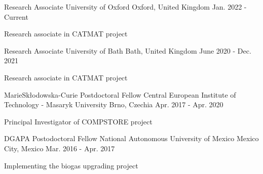 

\begin{cventries}

  \cventry
    {Research Associate} %
    {University of Oxford} %
    {Oxford, United Kingdom} %
    {Jan. 2022 - Current} %
    {
      \begin{cvitems} %
		\item {Research associate in CATMAT project}
      \end{cvitems}
    }
  
  \cventry
    {Research Associate} %
    {University of Bath} %
    {Bath, United Kingdom} %
    {June 2020 - Dec. 2021} %
    {
      \begin{cvitems} %
		\item {Research associate in CATMAT project}
      \end{cvitems}
    }
  
  \cventry
    {MarieSkłodowska-Curie Postdoctoral Fellow} %
    {Central European Institute of Technology - Masaryk University} %
    {Brno, Czechia} %
    {Apr. 2017 - Apr. 2020} %
    {
      \begin{cvitems} %
		\item {Principal Investigator of COMPSTORE project}
      \end{cvitems}
    }

  \cventry
    {DGAPA Postodoctoral Fellow} %
    {National Autonomous University of Mexico} %
    {Mexico City, Mexico} %
    {Mar. 2016 - Apr. 2017} %
    {
      \begin{cvitems} %
        \item {Implementing the biogas upgrading project}
      \end{cvitems}
    }


\end{cventries}
